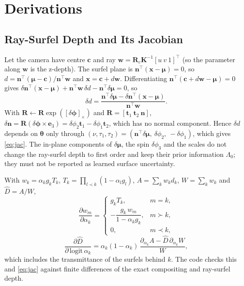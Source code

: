 \section{Derivations}
\label{sup:derivations}

\subsection{Ray-Surfel Depth and Its Jacobian}
Let the camera have centre $\mathbf{c}$ and ray $\mathbf{w}=\mathbf{R}_c\mathbf{K}^{-1}[u\ v\ 1]^{\top}$
(so the parameter along $\mathbf{w}$ is the z-depth). The surfel plane is
$\mathbf{n}^{\top}(\mathbf{x}-\boldsymbol\mu)=0$, so $d=\mathbf{n}^{\top}(\boldsymbol\mu-\mathbf{c})/\mathbf{n}^{\top}\mathbf{w}$
and $\mathbf{x}=\mathbf{c}+d\mathbf{w}$. Differentiating
$\mathbf{n}^{\top}(\mathbf{c}+d\mathbf{w}-\boldsymbol\mu)=0$ gives
$\delta\mathbf{n}^{\top}(\mathbf{x}-\boldsymbol\mu)+\mathbf{n}^{\top}\mathbf{w}\,\delta d-\mathbf{n}^{\top}\delta\boldsymbol\mu=0$, so
\[
\delta d=\frac{\mathbf{n}^{\top}\delta\boldsymbol\mu-\delta\mathbf{n}^{\top}(\mathbf{x}-\boldsymbol\mu)}{\mathbf{n}^{\top}\mathbf{w}} .
\]
With $\mathbf{R}\leftarrow\mathbf{R}\exp([\delta\boldsymbol\phi]_\times)$ and $\mathbf{R}=[\mathbf{t}_1\ \mathbf{t}_2\ \mathbf{n}]$,
$\delta\mathbf{n}=\mathbf{R}(\delta\boldsymbol\phi\times\mathbf{e}_3)=\delta\phi_2\mathbf{t}_1-\delta\phi_1\mathbf{t}_2$, which has no normal
component. Hence $\delta d$ depends on $\boldsymbol\theta$ only through
$(\nu,\tau_1,\tau_2)=(\mathbf{n}^{\top}\delta\boldsymbol\mu,\ \delta\phi_2,\ -\delta\phi_1)$, which gives \eqref{eq:jac}.
The in-plane components of $\delta\boldsymbol\mu$, the spin $\delta\phi_3$ and the scales do not change
the ray-surfel depth to first order and keep their prior information $\Lambda_0$; they must not be
reported as learned surface uncertainty.

 With $w_k=\alpha_kg_kT_k$, $T_k=\prod_{l\prec k}(1-\alpha_lg_l)$, $A=\sum_kw_kd_k$,
$W=\sum_kw_k$ and $\hat D=A/W$,
\[
\frac{\partial w_m}{\partial\alpha_k}=\begin{cases}g_kT_k,&m=k,\\ -\dfrac{g_k\,w_m}{1-\alpha_kg_k},&m\succ k,\\ 0,&m\prec k,\end{cases}
\]
\[
\frac{\partial\hat D}{\partial\,\mathrm{logit}\,\alpha_k}=\alpha_k(1-\alpha_k)\,\frac{\partial_{\alpha_k}A-\hat D\,\partial_{\alpha_k}W}{W},
\]
which includes the transmittance of the surfels behind $k$. The code checks this and \eqref{eq:jac}
against finite differences of the exact compositing and ray-surfel depth.

